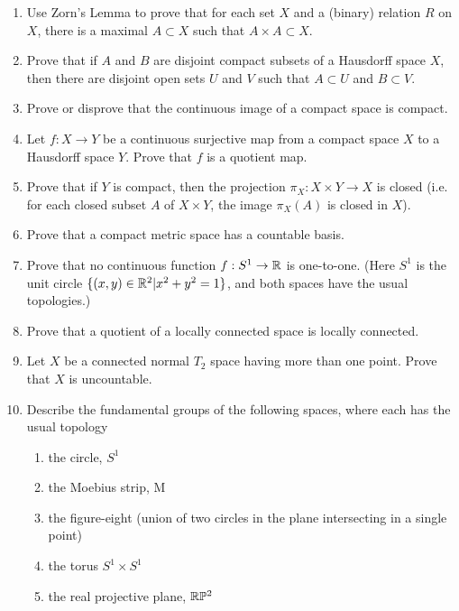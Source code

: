 \begin{enumerate}
\item Use Zorn's Lemma to prove that for each set $X$ and a (binary) relation
$R$ on $X$, there is a maximal $A \subset X$ such that $A \times A \subset X$.
\smallskip

\item Prove that if $A$ and $B$ are disjoint compact subsets of a Hausdorff
space $X$, then there are disjoint open sets $U$ and $V$ such that 
$A \subset U$ and $B \subset V$.
\smallskip

\item Prove or disprove that the continuous image of a compact space is 
compact.
\smallskip

\item Let $f:X\rightarrow Y$ be a continuous surjective map from a compact
space $X$ to a Hausdorff space $Y$.  Prove that $f$ is a quotient map.
\smallskip

\item Prove that if $Y$ is compact, then the projection $\pi_X:X\times Y
\rightarrow X$ is closed (i.e. for each closed subset $A$ of $X \times Y$,
the image $\pi_X(A)$ is closed in $X$).
\smallskip

\item Prove that a compact metric space has a countable basis.
\smallskip

\item Prove that no continuous function $f:S^1 \rightarrow {\Bbb R}$ is
one-to-one.  (Here $S^1$ is the unit circle $\{ (x,y) \in {\Bbb R}^2 |
x^2 + y^2 = 1 \}$, and both spaces have the usual topologies.)
\smallskip

\item Prove that a quotient of a locally connected space is locally
connected.
\smallskip

\item Let $X$ be a connected normal $T_2$ space having more than one
point.  Prove that $X$ is uncountable.
\smallskip

\item Describe the fundamental groups of the following spaces, where each
has the usual topology
\begin{enumerate}
\item the circle, $S^1$
\item the Moebius strip, M
\item the figure-eight (union of two circles in the plane intersecting in a
single point)
\item the torus $S^1 \times S^1$
\item the real projective plane, ${\Bbb R}{\Bbb P}^2$
\end{enumerate}
\end{enumerate}
